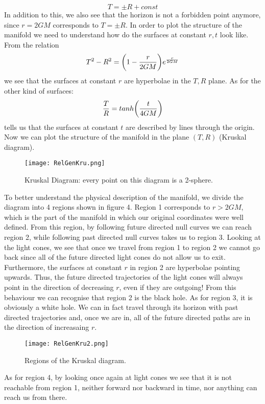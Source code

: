 \documentclass[]{article}
\theoremstyle{definition}
\theoremstyle{Theorem}
\theoremstyle{definition}
\theoremstyle{definition}
\theoremstyle{definition}
\begin{document}
$$T=\pm R+const$$
In addition to this, we also see that the horizon is not a forbidden point anymore, since $r=2GM$ corresponds to $T=\pm R$. In order to plot the structure of the manifold we need to understand how do the surfaces at constant $r,t$ look like. From the relation
$$T^2-R^2=\bigg(1-{r\over 2GM}\bigg)e^{r\over 2GM}$$
we see that the surfaces at constant $r$ are hyperbolae in the $T,R$ plane. As for the other kind of surfaces:
$${T\over R}=tanh\bigg({t\over 4GM}\bigg)$$
tells us that the surfaces at constant $t$ are described by lines through the origin. Now we can plot the structure of the manifold in the plane $(T,R)$ (Kruskal diagram).
\begin{center}
	\begin{figure}[h!]
		\centering
		\texttt{[image: RelGenKru.png]}
		\caption{Kruskal Diagram: every point on this diagram is a 2-sphere.}
	\end{figure}
\end{center}
To better understand the physical description of the manifold, we divide the diagram into 4 regions shown in figure 4. Region 1 corresponds to $r>2GM$, which is the part of the manifold in which our original coordinates were well defined. From this region, by following future directed null curves we can reach region 2, while following past directed null curves takes us to region 3. Looking at the light cones, we see that once we travel from region 1 to region 2 we cannot go back since all of the future directed light cones do not allow us to exit. Furthermore, the surfaces at constant $r$ in region 2 are hyperbolae pointing upwards. Thus, the future directed trajectories of the light cones will always point in the direction of decreasing $r$, even if they are outgoing! From this behaviour we can recognise that region 2 is the black hole. As for region 3, it is obviously a white hole. We can in fact travel through its horizon with past directed trajectories and, once we are in, all of the future directed paths are in the direction of increasaing $r$.
\begin{center}
	\begin{figure}[h!]
		\centering
		\texttt{[image: RelGenKru2.png]}
		\caption{Regions of the Kruskal diagram.}
	\end{figure}
\end{center}
As for region 4, by looking once again at light cones we see that it is not reachable from region 1, neither forward nor backward in time, nor anything can reach us from there.
\end{document}
